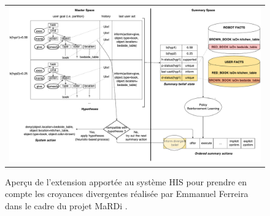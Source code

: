\documentclass[a4paper,11pt,twoside]{StyleThese}
\begin{document}
\clearpage

\begin{figure}
 \centering
 \begin{tabular}{c}
  \includegraphics[width=1.0\textwidth]{img/MaRDHIS.pdf}
 \end{tabular}
 \caption{Aperçu de l'extension apportée au système HIS pour prendre en compte les croyances divergentes réalisée par Emmanuel Ferreira dans le cadre du projet MaRDi \cite{ferreira2015phd}.}
 \label{fig:overview-mardhis}
\end{figure}


\clearpage
\end{document}
